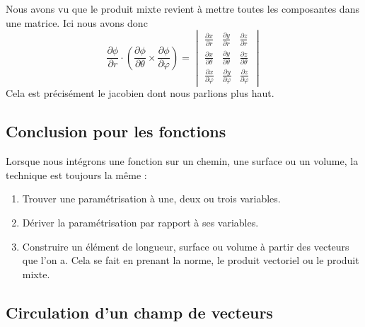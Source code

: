Nous avons vu que le produit mixte revient à mettre toutes les composantes dans une matrice. Ici nous avons donc
\begin{equation}
    \frac{ \partial \phi }{ \partial r }\cdot\left( \frac{ \partial \phi }{ \partial \theta }\times\frac{ \partial \phi }{ \partial \varphi } \right)=\begin{vmatrix}
        \frac{ \partial x }{ \partial r }    &   \frac{ \partial y }{ \partial r }    &   \frac{ \partial z }{ \partial r }    \\
        \frac{ \partial x }{ \partial \theta }    &   \frac{ \partial y }{ \partial \theta }    &   \frac{ \partial z }{ \partial \theta }    \\
        \frac{ \partial x }{ \partial \varphi }    &   \frac{ \partial y }{ \partial \varphi }    &   \frac{ \partial z }{ \partial \varphi }    
    \end{vmatrix}
\end{equation}
Cela est précisément le jacobien dont nous parlions plus haut.

\subsection{Conclusion pour les fonctions}

Lorsque nous intégrons une fonction sur un chemin, une surface ou un volume, la technique est toujours la même :
\begin{enumerate}
    \item
        Trouver une paramétrisation à une, deux ou trois variables.
    \item
        Dériver la paramétrisation par rapport à ses variables.
    \item
        Construire un élément de longueur, surface ou volume à partir des vecteurs que l'on a. Cela se fait en prenant la norme, le produit vectoriel ou le produit mixte.
\end{enumerate}

\subsection{Circulation d'un champ de vecteurs}

